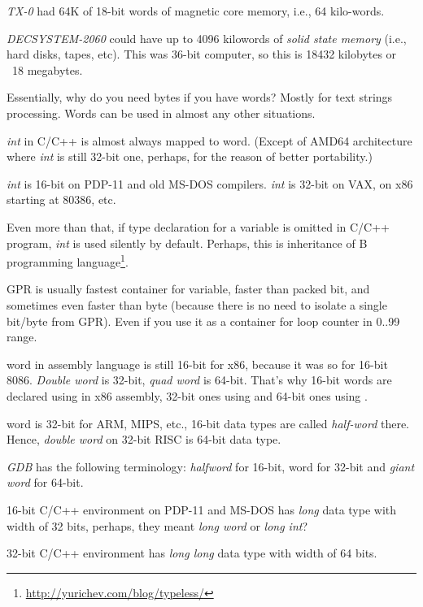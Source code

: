 \emph{TX-0} had 64K of 18-bit words of magnetic core memory,
i.e., 64 kilo-words.

\emph{DECSYSTEM-2060}
could have up to 4096 kilowords of \emph{solid state memory}
(i.e., hard disks, tapes, etc).
This was 36-bit computer, so this is 18432 kilobytes or ~18 megabytes.

Essentially, why do you need bytes if you have words?
Mostly for text strings processing.
Words can be used in almost any other situations.

\myhrule{}

\emph{int} in C/C++ is almost always mapped to \gls{word}.
(Except of AMD64 architecture where \emph{int} is still 32-bit one, perhaps, for the reason of better portability.)

\emph{int} is 16-bit on PDP-11 and old MS-DOS compilers.
\emph{int} is 32-bit on VAX, on x86 starting at 80386, etc.

Even more than that, if type declaration for a variable is omitted in C/C++ program, \emph{int} is used silently by default.
Perhaps, this is inheritance of B programming language\footnote{\url{http://yurichev.com/blog/typeless/}}.

\myhrule{}

\ac{GPR} is usually fastest container for variable, faster than packed bit,
and sometimes even faster than byte (because there is no need to isolate a single bit/byte from \ac{GPR}).
Even if you use it as a container for loop counter in 0..99 range.

\myhrule{}

\Gls{word} in assembly language is still 16-bit for x86, because it was so for 16-bit 8086.
\emph{Double word} is 32-bit, \emph{quad word} is 64-bit.
That's why 16-bit words are declared using  in x86 assembly, 32-bit ones using  and 64-bit ones using .

\Gls{word} is 32-bit for ARM, MIPS, etc., 16-bit data types are called \emph{half-word} there.
Hence, \emph{double word} on 32-bit RISC is 64-bit data type.

\emph{GDB} has the following terminology: \emph{halfword} for 16-bit, \gls{word} for 32-bit and \emph{giant word} for 64-bit.

16-bit C/C++ environment on PDP-11 and MS-DOS has \emph{long} data type with width of 32 bits, perhaps,
they meant \emph{long word} or \emph{long int}?

32-bit C/C++ environment has \emph{long long} data type with width of 64 bits.

